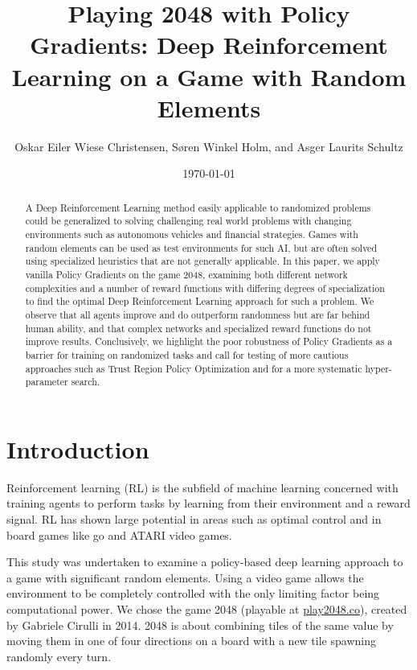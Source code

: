 \documentclass[11pt, fleqn]{article}
\title{\vspace{-2cm}Playing 2048 with Policy Gradients: Deep Reinforcement Learning on a Game with Random Elements}
\author{Oskar Eiler Wiese Christensen, Søren Winkel Holm, and Asger Laurits Schultz}
\date{\today}
\begin{document}
	
\maketitle
\vspace*{-1cm}
\begin{abstract}\noindent
A Deep Reinforcement Learning method easily applicable to randomized problems could be generalized to solving challenging real world problems with changing environments such as autonomous vehicles and financial strategies. Games with random elements can be used as test environments for such AI, but are often solved using specialized heuristics that are not generally applicable. In this paper, we apply vanilla Policy Gradients on the game 2048, examining both different network complexities and a number of reward functions with differing degrees of specialization to find the optimal Deep Reinforcement Learning approach for such a problem. We observe that all agents improve and do outperform randomness but are far behind human ability, and that complex networks and specialized reward functions do not improve results. Conclusively, we highlight the poor robustness of Policy Gradients as a barrier for training on randomized tasks and call for testing of more cautious approaches such as Trust Region Policy Optimization and for a more systematic hyper-parameter search.
\end{abstract}

\section{Introduction}
Reinforcement learning (RL) is the subfield of machine learning concerned with training agents to perform tasks by learning from their environment and a reward signal. RL has shown large potential in areas such as optimal control and in board games like go and ATARI video games.

This study was undertaken to examine a policy-based deep learning approach to a game with significant random elements. Using a video game allows the environment to be  completely controlled  with the only limiting factor being computational power. We chose the game 2048 (playable at \url{play2048.co}), created by Gabriele Cirulli in 2014. 2048 is about combining tiles of the same value by moving them in one of four directions on a board with a new tile spawning randomly every turn.
\end{document}
